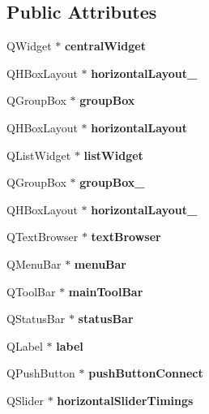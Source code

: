 \subsection*{Public Attributes}
\begin{DoxyCompactItemize}
\item 
\mbox{\label{class_ui___main_window_a6600dd3bdd3d55e535659e4a4096ea48}} 
Q\+Widget $\ast$ {\bfseries central\+Widget}
\item 
\mbox{\label{class_ui___main_window_ae4fc4a01984f4958d08903a46ce7509a}} 
Q\+H\+Box\+Layout $\ast$ {\bfseries horizontal\+Layout\+\_}
\item 
\mbox{\label{class_ui___main_window_ad396eaa8d855b13559c50e02164b8325}} 
Q\+Group\+Box $\ast$ {\bfseries group\+Box}
\item 
\mbox{\label{class_ui___main_window_ae7104d878681f568e492c5bd0f653157}} 
Q\+H\+Box\+Layout $\ast$ {\bfseries horizontal\+Layout}
\item 
\mbox{\label{class_ui___main_window_a89e0ee00764ef40b900ae0f190644540}} 
Q\+List\+Widget $\ast$ {\bfseries list\+Widget}
\item 
\mbox{\label{class_ui___main_window_a67c4e71bde8605c39057b72d14cbea4b}} 
Q\+Group\+Box $\ast$ {\bfseries group\+Box\+\_}
\item 
\mbox{\label{class_ui___main_window_a9ee21d2c2bc000e7a8ba931bacfc5a69}} 
Q\+H\+Box\+Layout $\ast$ {\bfseries horizontal\+Layout\+\_}
\item 
\mbox{\label{class_ui___main_window_a84c6f864ef5087858db20cf3901746d5}} 
Q\+Text\+Browser $\ast$ {\bfseries text\+Browser}
\item 
\mbox{\label{class_ui___main_window_a502a50d7dc22415f511336bdfb4318b9}} 
Q\+Menu\+Bar $\ast$ {\bfseries menu\+Bar}
\item 
\mbox{\label{class_ui___main_window_abca26371605d7c5235fab5188d4bdcf7}} 
Q\+Tool\+Bar $\ast$ {\bfseries main\+Tool\+Bar}
\item 
\mbox{\label{class_ui___main_window_afa919f3af6f2f526a70f1fa331f63724}} 
Q\+Status\+Bar $\ast$ {\bfseries status\+Bar}
\item 
\mbox{\label{class_ui___main_window_a78edcdd12ea78c06d7e80f322c8882f9}} 
Q\+Label $\ast$ {\bfseries label}
\item 
\mbox{\label{class_ui___main_window_a48fa9370856496c1b53acd023fa8d7b5}} 
Q\+Push\+Button $\ast$ {\bfseries push\+Button\+Connect}
\item 
\mbox{\label{class_ui___main_window_aad9e9965b1b2d32d3eed2743e60cd97e}} 
Q\+Slider $\ast$ {\bfseries horizontal\+Slider\+Timings}

\end{DoxyCompactItemize}

